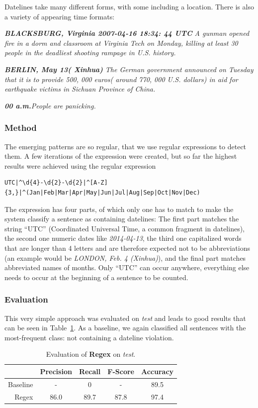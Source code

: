 \documentclass[a4paper,10pt]{scrartcl}
\theoremstyle{style}
\begin{document}
Datelines take many different forms, with some including a location. There is also a variety of appearing time formats:

\quad\textit{\textbf{BLACKSBURG, Virginia 2007-04-16 18:34: 44 UTC} A gunman opened fire in a dorm and classroom at Virginia Tech on Monday, killing at least 30 people in the deadliest shooting rampage in U.S. history.}

\quad\textit{\textbf{BERLIN, May 13( Xinhua)} The German government announced on Tuesday that it is to provide 500, 000 euros( around 770, 000 U.S. dollars) in aid for earthquake victims in Sichuan Province of China.}

\quad\textit{\textbf{00 a.m.}People are panicking.}

\subsubsection{Method}
The emerging patterns are so regular, that we use regular expressions to detect them. A few iterations of the expression were created, but so far the highest results were achieved using the regular expression

\begin{lstlisting}
UTC|^\d{4}-\d{2}-\d{2}|^[A-Z]{3,}|^(Jan|Feb|Mar|Apr|May|Jun|Jul|Aug|Sep|Oct|Nov|Dec)
\end{lstlisting}

The expression has four parts, of which only one has to match to make the system classify a sentence as containing datelines: The first part matches the string ``UTC'' (Coordinated Universal Time, a common fragment in datelines), the second one numeric dates like \textit{2014-04-13}, the third one capitalized words that are longer than 4 letters and are therefore expected not to be abbreviations (an example would be \textit{LONDON, Feb. 4 (Xinhua)}), and the final part matches abbreviated names of months. Only ``UTC'' can occur anywhere, everything else needs to occur at the beginning of a sentence to be counted.

\subsubsection{Evaluation}
This very simple approach was evaluated on \textit{test} and leads to good results that can be seen in Table~\ref{eval_regex}. As a baseline, we again classified all sentences with the most-frequent class: not containing a dateline violation.

\begin{table}
\begin{center}
\begin{tabular}{|r|c|c|c|c|}
  \hline
  & \textbf{Precision} & \textbf{Recall} & \textbf{F-Score} & \textbf{Accuracy}\\
  \hline
  Baseline & - & 0 & - & 89.5\\
  \hline
  Regex & 86.0 & 89.7 & 87.8 & 97.4\\
  \hline
  \end{tabular}
\end{center}
\caption{Evaluation of \textbf{Regex} on \textit{test}.}
\label{eval_regex}
\end{table}
\end{document}
